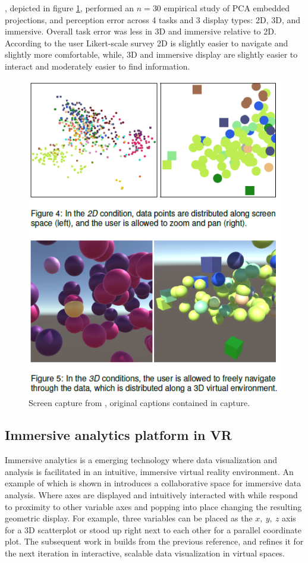 \documentclass{monashthesis}
\begin{document}
\textcite{wagner_filho_immersive_2018}, depicted in figure
\ref{fig:wagner18fig}, performed an \(n=30\) empirical study of PCA
embedded projections, and perception error across 4 tasks and 3 display
types: 2D, 3D, and immersive. Overall task error was less in 3D and
immersive relative to 2D. According to the user Likert-scale survey 2D
is slightly easier to navigate and slightly more comfortable, while, 3D
and immersive display are slightly easier to interact and moderately
easier to find information.





\begin{figure}

{\centering \includegraphics[width=0.5\linewidth]{./figures/wagner18fig} 

}

\caption{Screen capture from
\textcite{wagner_filho_immersive_2018}, original captions contained in
capture.}\label{fig:wagner18fig}
\end{figure}

\subsection{Immersive analytics platform in
VR}\label{immersive-analytics-platform-in-vr}

Immersive analytics is a emerging technology where data visualization
and analysis is facilitated in an intuitive, immersive virtual reality
environment. An example of which is shown in
\textcite{cordeil_imaxes:_2017} introduces a collaborative space for
immersive data analysis. Where axes are displayed and intuitively
interacted with while respond to proximity to other variable axes and
popping into place changing the resulting geometric display. For
example, three variables can be placed as the \(x,~y,~z\) axis for a 3D
scatterplot or stood up right next to each other for a parallel
coordinate plot. The subsequent work in
\textcite{cordeil_immersive_2019} builds from the previous reference,
and refines it for the next iteration in interactive, scalable data
visualization in virtual spaces.
\end{document}
